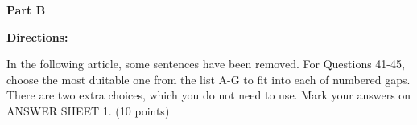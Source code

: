 
\textbf{Part B}

\textbf{Directions:}

In the following article, some sentences have been removed. For Questions 41-45, choose the most duitable one from the list A-G to fit into each of numbered gaps. There are two extra choices, which you do not need to use. Mark your answers on ANSWER SHEET 1. (10 points)

\vspace{6pt}